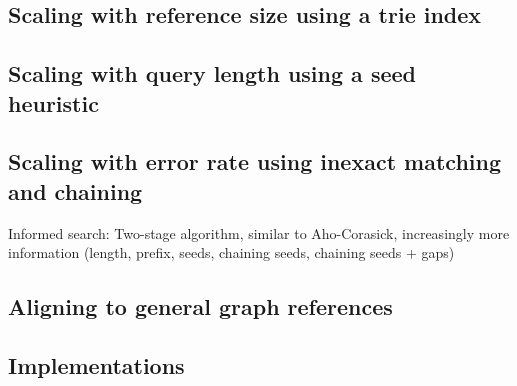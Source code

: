 \subsection*{Scaling with reference size using a trie index}




\subsection*{Scaling with query length using a seed heuristic}

\subsection*{Scaling with error rate using inexact matching and chaining}

Informed search: Two-stage algorithm, similar to Aho-Corasick, increasingly more information (length, prefix, seeds, chaining seeds, chaining seeds + gaps)

\subsection*{Aligning to general graph references}

\subsection*{Implementations}